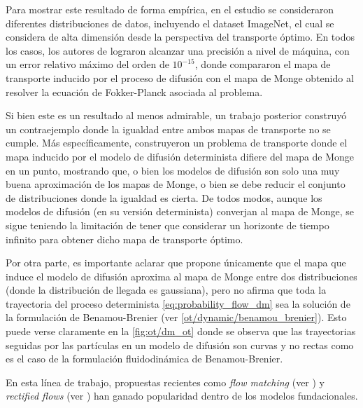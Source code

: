 Para mostrar este resultado de forma empírica, en el estudio se consideraron diferentes distribuciones de datos, incluyendo el dataset ImageNet, el cual se considera de alta dimensión desde la perspectiva del transporte óptimo. En todos los casos, los autores de \cite{khrulkov2022understandingddpmlatentcodes} lograron alcanzar una precisión a nivel de máquina, con un error relativo máximo del orden de $10^{-15}$, donde compararon el mapa de transporte inducido por el proceso de difusión con el mapa de Monge obtenido al resolver la ecuación de Fokker-Planck asociada al problema.

Si bien este es un resultado al menos admirable, un trabajo posterior \cite{LAVENANT2022108225} construyó un contraejemplo donde la igualdad entre ambos mapas de transporte no se cumple. Más específicamente, construyeron un problema de transporte donde el mapa inducido por el modelo de difusión determinista difiere del mapa de Monge en un punto, mostrando que, o bien los modelos de difusión son solo una muy buena aproximación de los mapas de Monge, o bien se debe reducir el conjunto de distribuciones donde la igualdad es cierta. De todos modos, aunque los modelos de difusión (en su versión determinista) converjan al mapa de Monge, se sigue teniendo la limitación de tener que considerar un horizonte de tiempo infinito para obtener dicho mapa de transporte óptimo.

Por otra parte, es importante aclarar que \cite{khrulkov2022understandingddpmlatentcodes} propone únicamente que el mapa que induce el modelo de difusión aproxima al mapa de Monge entre dos distribuciones (donde la distribución de llegada es gaussiana), pero no afirma que toda la trayectoria del proceso determinista \eqref{eq:probability_flow_dm} sea la solución de la formulación de Benamou-Brenier (ver \autoref{ot/dynamic/benamou_brenier}). Esto puede verse claramente en la \autoref{fig:ot/dm_ot} donde se observa que las trayectorias seguidas por las partículas en un modelo de difusión son curvas y no rectas como es el caso de la formulación fluidodinámica de Benamou-Brenier.


En esta línea de trabajo, propuestas recientes como \textit{flow matching} (ver \cite{lipman2023flowmatchinggenerativemodeling}) y \textit{rectified flows} (ver \cite{liu2022flowstraightfastlearning}) han ganado popularidad dentro de los modelos fundacionales.

